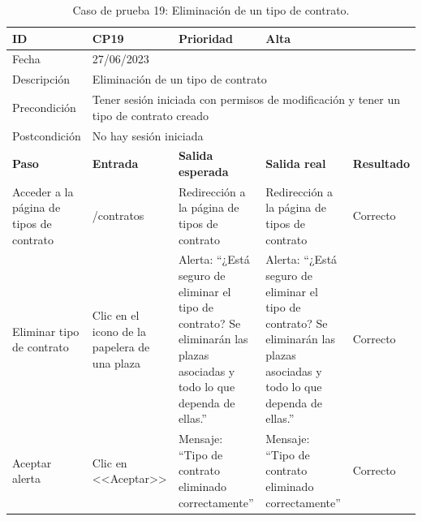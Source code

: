 \begin{table}[H]
\begin{tabular}{p{} p{} p{} p{} p{}}
\cellcolor{gray!25}
ID   & CP19 & \cellcolor{gray!25} Prioridad   & Alta \\ \hline
\cellcolor{gray!25} Fecha	&	\multicolumn{4}{l}{27/06/2023} \\ \hline
\cellcolor{gray!25} Descripción		&	\multicolumn{4}{l}{Eliminación de un tipo de contrato} \\ \hline                                            
\cellcolor{gray!25}
Precondición  & \multicolumn{4}{p{.66\textwidth}}{Tener sesión iniciada con permisos de modificación y tener un tipo de contrato creado} \\ \hline
\cellcolor{gray!25} Postcondición & \multicolumn{4}{l}{No hay sesión iniciada}                                                    \\ \hline
\rowcolor{gray!25}
\textbf{Paso}   & \textbf{Entrada} & \textbf{Salida esperada} & \textbf{Salida real} & \textbf{Resultado} \\ \hline
Acceder a la página de tipos de contrato 
& /contratos                                                                          
& Redirección a la página de tipos de contrato                                    
& Redirección a la página de tipos de contrato                                    
& Correcto                            
\\ \hline
Eliminar tipo de contrato
& Clic en el icono de la papelera de una plaza
& Alerta: ``¿Está seguro de eliminar el tipo de contrato? Se eliminarán las plazas asociadas y todo lo que dependa de ellas.''
& Alerta: ``¿Está seguro de eliminar el tipo de contrato? Se eliminarán las plazas asociadas y todo lo que dependa de ellas.''
& Correcto
\\ \hline
Aceptar alerta
& Clic en <<Aceptar>>
& Mensaje: ``Tipo de contrato eliminado correctamente'' 
& Mensaje: ``Tipo de contrato eliminado correctamente'' 
& Correcto
\\ \hline             
\end{tabular}
\caption{Caso de prueba 19: Eliminación de un tipo de contrato.}
\end{table}

